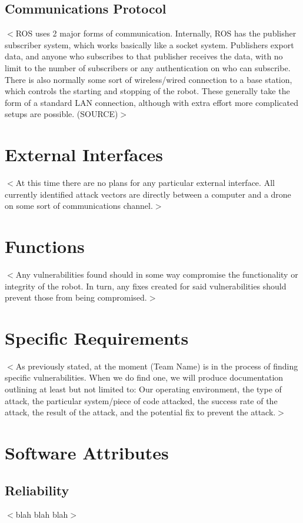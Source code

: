 \documentclass{scrreprt}
\begin{document}
\subsection{Communications Protocol}
$<$ROS uses 2 major forms of communication. Internally, ROS has the publisher subscriber system, which works basically like a socket system.
Publishers export data, and anyone who subscribes to that publisher receives the data, with no limit to the number of
subscribers or any authentication on who can subscribe. There is also normally some sort of wireless/wired connection to a base
station, which controls the starting and stopping of the robot. These generally take the form of a standard LAN connection,
although with extra effort more complicated setups are possible. (SOURCE)$>$

\section{External Interfaces}
$<$At this time there are no plans for any particular external interface. All currently identified attack vectors are directly between a computer and a drone on some sort of communications channel.$>$

\section{Functions}
$<$Any vulnerabilities found should in some way compromise the functionality or integrity of the robot. In turn, any fixes created for said vulnerabilities should prevent those from being compromised.$>$

\section{Specific Requirements}
$<$As previously stated, at the moment (Team Name) is in the process of finding specific vulnerabilities. When we do find one, we will produce documentation outlining at least but not limited to:
Our operating environment, the type of attack, the particular system/piece of code attacked, the success rate of the attack, the result of the attack, and the potential fix to prevent the attack.$>$

\section{Software Attributes}
  \subsection{Reliability}
  $<$blah blah blah$>$
\end{document}
